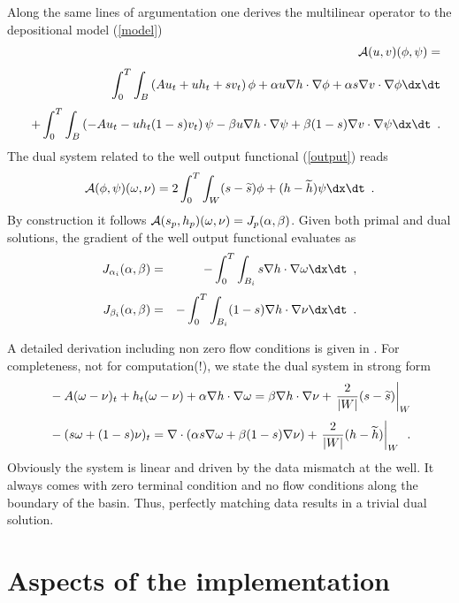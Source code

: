 Along the same lines of argumentation one derives the multilinear operator to the depositional model (\ref{model})
\begin{eqnarray*} 
 && \displaystyle {\cal A}(u,v)(\phi,\psi) = \\[\jot]
 && \displaystyle \int_0^T \int_B \left(Au_t+uh_t+sv_t\right)\phi + \alpha u \nabla h \cdot \nabla \phi 
   + \alpha s \nabla v \cdot \nabla \phi \dx \dt \\[\jot]
 && \displaystyle + \int_0^T \int_B \left(-Au_t-uh_t(1-s)v_t\right)\psi -\beta u \nabla h \cdot \nabla \psi 
   + \beta (1-s) \nabla v \cdot \nabla \psi \dx \dt 
 \enspace .
\end{eqnarray*}
The dual system related to the well output functional (\ref{output}) reads
$$
 {\cal A}(\phi,\psi)(\omega,\nu) = 
  2 \int_0^T \int_W (s - \widetilde s) \phi + (h - \widetilde h) \psi \dx \dt
  \enspace .
$$
By construction it follows ${\cal A}(s_p,h_p)(\omega,\nu) = J_p(\alpha,\beta)$.
Given both primal and dual solutions, the gradient of the well output functional evaluates as
\begin{eqnarray*}
 J_{\alpha_i}(\alpha,\beta) &=& 
 - \int_0^T \int_{B_i} s \nabla h \cdot \nabla \omega \dx \dt \enspace , \\[\jot]
 J_{\beta_i}(\alpha,\beta) &=& 
 - \int_0^T \int_{B_i} (1-s) \nabla h \cdot \nabla \nu \dx \dt
 \enspace .
\end{eqnarray*}

A detailed derivation including non zero flow conditions is given in \cite{Sch08}.
For completeness, not for computation(!), we state the dual system in strong form
\begin{eqnarray*}
 & \displaystyle -A(\omega-\nu)_t + h_t(\omega-\nu) + \alpha \nabla h \cdot \nabla \omega 
 = \beta \nabla h \cdot \nabla \nu + \left. \frac{2}{|W|} (s - \widetilde s) \right|_W \\[\jot]
 & \displaystyle -(s\omega + (1-s)\nu)_t
 = \nabla \cdot (\alpha s \nabla \omega + \beta (1-s) \nabla \nu) + \left. \frac{2}{|W|} (h - \widetilde h) \right|_W \enspace .
\end{eqnarray*}
Obviously the system is linear and driven by the data mismatch at the well.
It always comes with zero terminal condition and no flow conditions along the boundary of the basin.
Thus, perfectly matching data results in a trivial dual solution.

\section{Aspects of the implementation}

